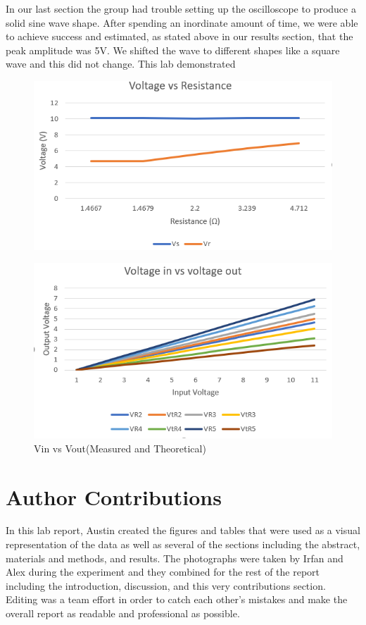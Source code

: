 \documentclass[10pt,twocolumn]{article}
\begin{document}
In our last section the group had trouble setting up the oscilloscope to produce a solid sine wave shape. After spending an inordinate amount of time, we were able to achieve success and estimated, as stated above in our results section, that the peak amplitude was 5V. We shifted the wave to different shapes like a square wave and this did not change. 
This lab demonstrated 
\begin{figure}
	\centering
	\includegraphics[width=.9\linewidth]{figures/V vs R.PNG}
	\caption{}
	\label{fig:graph}
\end{figure}

\begin{figure}
	\centering
	\includegraphics[width=.9\linewidth]{figures/Vin vs Vout.PNG}
	\caption{Vin vs Vout(Measured and Theoretical)}
	\label{fig:vin/out}
\end{figure}

\section{Author Contributions}

In this lab report, Austin created the figures and tables that were used as a visual representation of the data as well as several of the sections including the abstract, materials and methods, and results.
The photographs were taken by Irfan and Alex during the experiment and they combined for the rest of the report including the introduction, discussion, and this very contributions section. Editing was a team effort in order to catch each other's mistakes and make the overall report as readable and professional as possible. 
\end{document}
